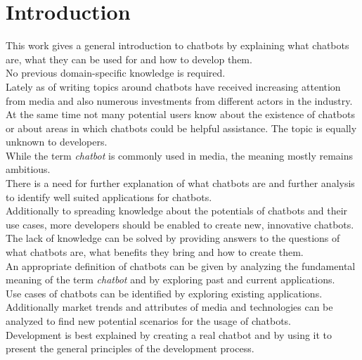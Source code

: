 \chapter{Introduction}

\pagestyle{useheadings} %


This work gives a general introduction to chatbots
by explaining what chatbots are, what they can be used for and how to develop them.
\\
No previous domain-specific knowledge is required.
\\

Lately as of writing topics around chatbots have received increasing attention from media and also numerous investments from different actors in the industry.
\\
At the same time not many potential users know about the existence of chatbots or about areas in which chatbots could be helpful assistance.
The topic is equally unknown to developers.
\\
While the term \emph{chatbot} is commonly used in media, the meaning mostly remains ambitious.
\\
There is a need for further explanation of what chatbots are and further analysis to identify well suited applications for chatbots.
\\
Additionally to spreading knowledge about the potentials of chatbots and their use cases,
more developers should be enabled to create new, innovative chatbots.
\\

The lack of knowledge can be solved by providing answers to the questions of what chatbots are, what benefits they bring and how to create them.
\\
An appropriate definition of chatbots can be given by analyzing the fundamental meaning of the term \emph{chatbot} and by exploring past and current applications.
\\
Use cases of chatbots can be identified by exploring existing applications. Additionally market trends and attributes of media and technologies can be analyzed to find new potential scenarios for the usage of chatbots.
\\
Development is best explained by creating a real chatbot and by using it to present the general principles of the development process.
\\

